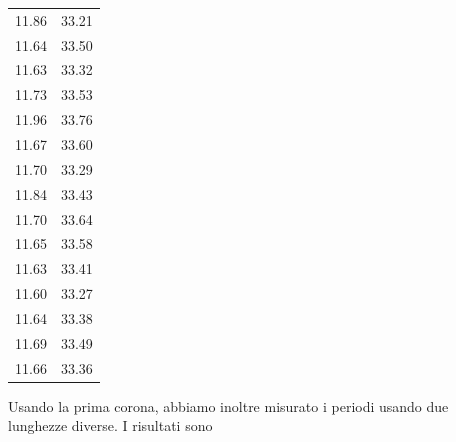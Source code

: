 \documentclass[a4paper]{article}
\begin{document}
\begin{table}[!ht]
\begin{tabular}{|c|c|}
    \hline
    11.86 & 33.21 \\
    11.64 & 33.50 \\
    11.63 & 33.32 \\
    11.73 & 33.53 \\
    11.96 & 33.76 \\
    11.67 & 33.60 \\
    11.70 & 33.29 \\
    11.84 & 33.43 \\
    11.70 & 33.64 \\
    11.65 & 33.58 \\
    11.63 & 33.41 \\
    11.60 & 33.27 \\
    11.64 & 33.38 \\
    11.69 & 33.49 \\
    11.66 & 33.36 \\
    \hline
    \end{tabular}
\end{table}
\FloatBarrier
Usando la prima corona, abbiamo inoltre misurato i periodi usando due lunghezze diverse. I risultati sono
\end{document}
